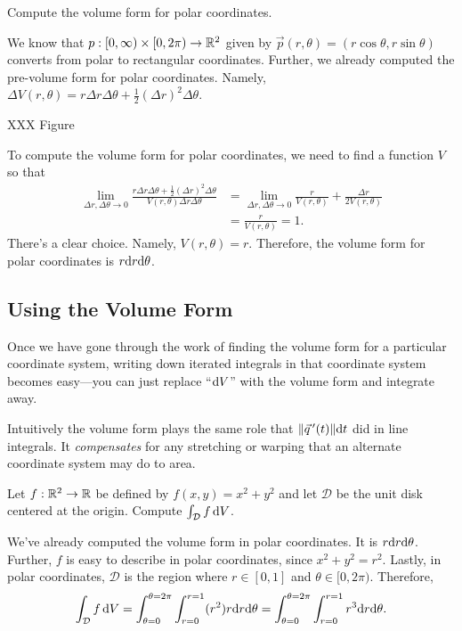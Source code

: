 \begin{example}
	Compute the volume form for polar coordinates.

	We know that $p:[0,\infty)\times [0,2\pi)\to\mathbb{R}^2$ given 
	by $\vec p(r,\theta)=(r\cos\theta,r\sin\theta)$ converts from polar to rectangular
	coordinates.  Further, we already computed the pre-volume form for polar
	coordinates.  Namely, $\Delta V(r,\theta) = r\Delta r\Delta \theta+\tfrac{1}{2}(\Delta r)^2\Delta \theta$.

	XXX Figure


	To compute the volume form for polar coordinates, we need to find a function $V$ so that
	\begin{align*}
		\lim_{\Delta r,\Delta \theta\to 0}
		\frac{r\Delta r\Delta \theta+\tfrac{1}{2}(\Delta r)^2\Delta \theta}{V(r,\theta)\Delta r\Delta\theta}
		&=\lim_{\Delta r,\Delta \theta\to 0}
		\frac{r}{V(r,\theta)} + \frac{\Delta r}{2V(r,\theta)}\\
		&=\frac{r}{V(r,\theta)} = 1.
	\end{align*}
	There's a clear choice.  Namely, $V(r,\theta)=r$.  Therefore, the volume form for
	polar coordinates is $r\mathrm{d} r\mathrm{d} \theta$.

\end{example}

\subsection{Using the Volume Form}

Once we have gone through the work of finding the volume form for a particular
coordinate system, writing down iterated integrals in that coordinate
system becomes easy---you can just replace ``$\mathrm{d} V$'' with the volume form
and integrate away.

Intuitively the volume form plays the same role that $\lVert\vec q\,'(t)\rVert\mathrm{d} t$ did
in line integrals.  It \emph{compensates} for any stretching or warping that
an alternate coordinate system may do to area.

\begin{example}
	Let $f:\mathbb{R}^2\to\mathbb{R}$ be defined by $f(x,y)=x^2+y^2$ and let $\mathcal D$ be the unit
	disk centered at the origin.  Compute $\int_{\mathcal D} f\,\mathrm{d} V$.

	We've already computed the volume form in polar coordinates.  It is
	$r\mathrm{d} r\mathrm{d}\theta$.  Further, $f$ is easy to describe in polar coordinates,
	since $x^2+y^2=r^2$.  Lastly, in polar coordinates, $\mathcal D$ 
	is the region where $r\in[0,1]$ and $\theta\in[0,2\pi)$.  Therefore,
	\[
		\int_{\mathcal D}f\,\mathrm{d} V =
		\int_{\theta=0}^{\theta=2\pi}\int_{r=0}^{r=1} (r^2)r\mathrm{d} r\mathrm{d} \theta
		=\int_{\theta=0}^{\theta=2\pi}\int_{r=0}^{r=1} r^3\mathrm{d} r\mathrm{d} \theta.
	\]
\end{example}


